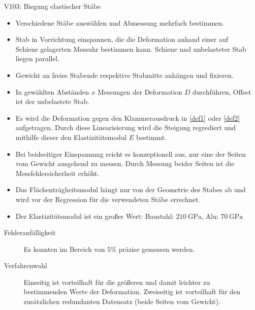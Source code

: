 \begin{Versuch}{V103: Biegung elastischer Stäbe}
        \begin{Durchführung}
            \begin{itemize}
            \item Verschiedene Stäbe auswählen und Abmessung mehrfach bestimmen.
            \item Stab in Vorrichtung einspannen, die die Deformation anhand einer auf Schiene gelagerten Messuhr bestimmen kann.
            Schiene und unbelasteter Stab liegen parallel.
            \item Gewicht an freies Stabende respektive Stabmitte anhängen und fixieren.
            \item In gewählten Abständen $x$ Messungen der Deformation $D$ durchführen, Offset ist der unbelastete Stab.
            \end{itemize}
        \end{Durchführung}

        \begin{Auswertung}
	        \begin{itemize}
	        	\item Es wird die Deformation gegen den Klammerausdruck in \eqref{def1} oder \eqref{def2} aufgetragen.
	        	Durch diese Linearisierung wird die Steigung regrediert und mithilfe dieser den Elastizitätsmodul $E$ bestimmt.
	        	\item Bei beidseitiger Einspannung reicht es konzeptionell aus, nur eine der Seiten vom Gewicht ausgehend zu messen.
	        	Durch Messung beider Seiten ist die Messfehlersicherheit erhöht.
	        	\item Das Flächenträgheitsmodul hängt nur von der Geometrie des Stabes ab und wird vor der Regression für die verwendeten Stäbe errechnet.
	        	\item Der Elastizitätsmodul ist ein großer Wert:
	        	Baustahl: $\SI{210}{\giga\pascal}$, Alu: $\SI{70}{\giga\pascal}$
        	\end{itemize}
        \end{Auswertung}
        
        \begin{Diskussion}
	        \begin{description}
	        	\item [Fehleranfälligkeit] Es konnten im Bereich von $5\%$ präzise gemessen werden.
	        	\item [Verfahrenwahl] Einseitig ist vorteilhaft für die größeren und damit leichter zu bestimmenden Werte der Deformation.
	        	Zweiseitig ist vorteilhaft für den zusätzlichen redundanten Datensatz (beide Seiten vom Gewicht).
        	\end{description}
        \end{Diskussion}


\end{Versuch}
